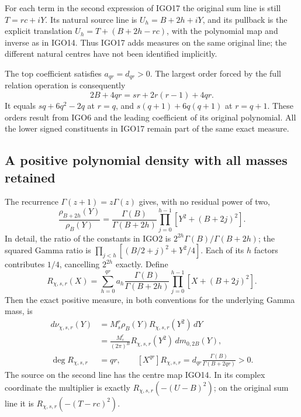 For each term in the second expression of IGO17 the original
sum line is still $T=rc+iY$. Its natural source line is
$U_h=B+2h+iY$, and its pullback is the explicit translation
$U_h=T+(B+2h-rc)$, with the polynomial map and inverse as in
IGO14. Thus IGO17 adds measures on the same original line; the
different natural centres have not been identified implicitly.

The top coefficient satisfies $a_{qr}=d_{qr}>0$. The largest
order forced by the full relation operation is consequently
\[
 2B+4qr=sr+2r(r-1)+4qr.
 \tag{IGO18}
\]
It equals $sq+6q^2-2q$ at $r=q$, and
$s(q+1)+6q(q+1)$ at $r=q+1$. These orders result from IGO6
and the leading coefficient of its original polynomial.
All the lower signed constituents in IGO17 remain part of the
same exact measure.

\subsection{A positive polynomial density with all masses retained}
The recurrence $\Gamma(z+1)=z\Gamma(z)$ gives, with no residual
power of two,
\[
 \frac{\rho_{B+2h}(Y)}{\rho_B(Y)}
 =\frac{\Gamma(B)}{\Gamma(B+2h)}
       \prod_{j=0}^{h-1}\left[Y^2+(B+2j)^2\right].
 \tag{IGO19}
\]
In detail, the ratio of the constants in IGO2 is
$2^{2h}\Gamma(B)/\Gamma(B+2h)$; the squared Gamma ratio is
$\prod_{j<h}[(B/2+j)^2+Y^2/4]$. Each of its $h$ factors
contributes $1/4$, cancelling $2^{2h}$ exactly. Define
\[
 R_{\chi,s,r}(X)=\sum_{h=0}^{qr}
   a_h\frac{\Gamma(B)}{\Gamma(B+2h)}
      \prod_{j=0}^{h-1}[X+(B+2j)^2].
 \tag{IGO20}
\]
Then the exact positive measure, in both conventions for the
underlying Gamma mass, is
\[
 \begin{split}
 d\nu_{\chi,s,r}(Y)
    &=M_s^r\rho_B(Y)R_{\chi,s,r}(Y^2)\,dY\\
    &=\frac{M_s^r}{(2\pi)^B}
           R_{\chi,s,r}(Y^2)\,dm_{0,2B}(Y),\\
 \deg R_{\chi,s,r}&=qr,\qquad
 [X^{qr}]R_{\chi,s,r}
       =d_{qr}\frac{\Gamma(B)}{\Gamma(B+2qr)}>0.
 \end{split}
 \tag{IGO21}
\]
The source on the second line has the centre map IGO14. In its
complex coordinate the multiplier is exactly
$R_{\chi,s,r}(-(U-B)^2)$; on the original sum line it is
$R_{\chi,s,r}(-(T-rc)^2)$.

